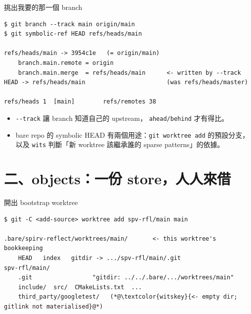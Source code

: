 \begin{frame}[fragile]{挑出我要的那一個 branch}
\begin{lstlisting}
$ git branch --track main origin/main
$ git symbolic-ref HEAD refs/heads/main

refs/heads/main -> 3954c1e   (= origin/main)
    branch.main.remote = origin
    branch.main.merge  = refs/heads/main      <- written by --track
HEAD -> refs/heads/main                       (was refs/heads/master)

refs/heads 1  [main]        refs/remotes 38
\end{lstlisting}

\begin{itemize}\footnotesize
  \item \texttt{-{}-track} 讓 branch 知道自己的 upstream，
        \texttt{ahead/behind} 才有得比。
  \item bare repo 的 symbolic HEAD 有兩個用途：\texttt{git worktree add}
        的預設分支，以及 \texttt{wits} 判斷「新 worktree 該繼承誰的
        sparse patterns」的依據。
\end{itemize}
\end{frame}

\section{二、objects：一份 store，人人來借}

\begin{frame}[fragile]{開出 bootstrap worktree}
\begin{lstlisting}
$ git -C <add-source> worktree add spv-rfl/main main

.bare/spirv-reflect/worktrees/main/       <- this worktree's bookkeeping
    HEAD   index   gitdir -> .../spv-rfl/main/.git
spv-rfl/main/
    .git                 "gitdir: ../../.bare/.../worktrees/main"
    include/  src/  CMakeLists.txt  ...
    third_party/googletest/   (*@\textcolor{witskey}{<- empty dir; gitlink not materialised}@*)
\end{lstlisting}

\end{frame}

